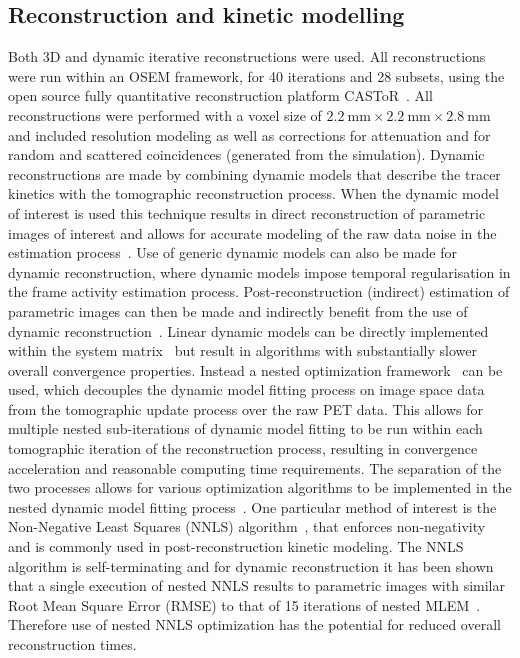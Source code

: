 \subsection*{Reconstruction and kinetic modelling}
Both 3D and dynamic iterative reconstructions were used. All reconstructions were run within an OSEM framework, for 40 iterations and 28 subsets, using the open source fully quantitative reconstruction platform CASToR~\cite{Merlin2018}. 
All reconstructions were performed with a voxel size of $2.2~\mathrm{mm}\times2.2~\mathrm{mm}\times2.8~\mathrm{mm}$ and included resolution modeling as well as corrections for attenuation and for random and scattered coincidences (generated from the simulation).
Dynamic reconstructions are made by combining dynamic models that describe the tracer kinetics with the tomographic reconstruction process. When the dynamic model of interest is used this technique results in direct reconstruction of parametric images of interest and allows for accurate modeling of the raw data noise in the estimation process~\cite{Carson1985,Matthews1995,Kamasak2003,Wang2008}. Use of generic dynamic models can also be made for dynamic reconstruction, where dynamic models impose temporal regularisation in the frame activity estimation process. Post-reconstruction (indirect) estimation of parametric images can then be made and indirectly benefit from the use of dynamic reconstruction~\cite{Reader2014,Novosad2016b}.
Linear dynamic models can be directly implemented within the system matrix~\cite{Matthews1995,Wang2008,Reader2014} but result in algorithms with substantially slower overall convergence properties.
Instead a nested optimization framework~\cite{Wang2010,Matthews2010} can be used, which decouples the dynamic model fitting process on image space data from the tomographic update process over the raw PET data. This allows for multiple nested sub-iterations of dynamic model fitting to be run within each tomographic iteration of the reconstruction process, resulting in convergence acceleration and reasonable computing time requirements.
The separation of the two processes allows for various optimization algorithms to be implemented in the nested dynamic model fitting process~\cite{Matthews2010}. One particular method of interest is the Non-Negative Least Squares (NNLS) algorithm~\cite{Lawson1995}, that enforces non-negativity and is commonly used in post-reconstruction kinetic modeling. The NNLS algorithm is self-terminating and for dynamic reconstruction it has been shown that a single execution of nested NNLS results to parametric images with similar Root Mean Square Error (RMSE) to that of 15 iterations of nested MLEM~\cite{Matthews2010}. Therefore use of nested NNLS optimization has the potential for reduced overall reconstruction times.
